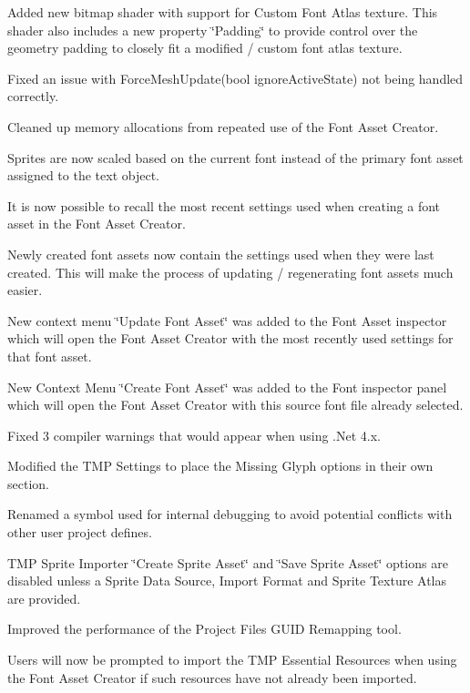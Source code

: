 \begin{DoxyItemize}
\item Added new bitmap shader with support for Custom Font Atlas texture. This shader also includes a new property \char`\"{}\+Padding\char`\"{} to provide control over the geometry padding to closely fit a modified / custom font atlas texture.
\item Fixed an issue with Force\+Mesh\+Update(bool ignore\+Active\+State) not being handled correctly.
\item Cleaned up memory allocations from repeated use of the Font Asset Creator.
\item Sprites are now scaled based on the current font instead of the primary font asset assigned to the text object.
\item It is now possible to recall the most recent settings used when creating a font asset in the Font Asset Creator.
\item Newly created font assets now contain the settings used when they were last created. This will make the process of updating / regenerating font assets much easier.
\item New context menu \char`\"{}\+Update Font Asset\char`\"{} was added to the Font Asset inspector which will open the Font Asset Creator with the most recently used settings for that font asset.
\item New Context Menu \char`\"{}\+Create Font Asset\char`\"{} was added to the Font inspector panel which will open the Font Asset Creator with this source font file already selected.
\item Fixed 3 compiler warnings that would appear when using .Net 4.\+x.
\item Modified the T\+MP Settings to place the Missing Glyph options in their own section.
\item Renamed a symbol used for internal debugging to avoid potential conflicts with other user project defines.
\item T\+MP Sprite Importer \char`\"{}\+Create Sprite Asset\char`\"{} and \char`\"{}\+Save Sprite Asset\char`\"{} options are disabled unless a Sprite Data Source, Import Format and Sprite Texture Atlas are provided.
\item Improved the performance of the Project Files G\+U\+ID Remapping tool.
\item Users will now be prompted to import the T\+MP Essential Resources when using the Font Asset Creator if such resources have not already been imported.
\end{DoxyItemize}


